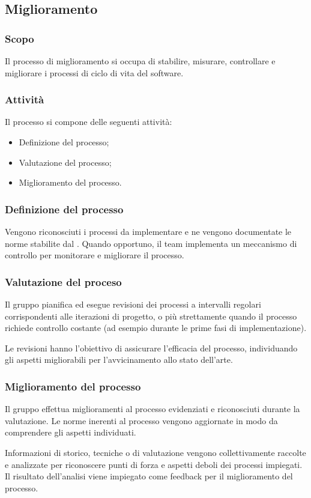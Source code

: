 \subsection{Miglioramento}
\subsubsection{Scopo}
\par Il processo di miglioramento si occupa di stabilire, misurare, controllare e migliorare i processi di ciclo di vita del software.

\subsubsection{Attività}
\par Il processo si compone delle seguenti attività:
\begin{itemize}
  \item Definizione del processo;
  \item Valutazione del processo;
  \item Miglioramento del processo.
\end{itemize}

\subsubsection{Definizione del processo}
\par Vengono riconosciuti i processi da implementare e ne vengono documentate le norme stabilite dal \WoW. Quando opportuno, il team implementa un meccanismo di controllo per monitorare e migliorare il processo.

\subsubsection{Valutazione del proceso}
\par Il gruppo pianifica ed esegue revisioni dei processi a intervalli regolari corrispondenti alle iterazioni di progetto, o più strettamente quando il processo richiede controllo costante (ad esempio durante le prime fasi di implementazione).

\par Le revisioni hanno l'obiettivo di assicurare l'efficacia del processo, individuando gli aspetti migliorabili per l'avvicinamento allo stato dell'arte.

\subsubsection{Miglioramento del processo}
\par Il gruppo effettua miglioramenti al processo evidenziati e riconosciuti durante la valutazione. Le norme inerenti al processo vengono aggiornate in modo da comprendere gli aspetti individuati.

\par Informazioni di storico, tecniche o di valutazione vengono collettivamente raccolte e analizzate per riconoscere punti di forza e aspetti deboli dei processi impiegati. Il risultato dell'analisi viene impiegato come feedback per il miglioramento del processo.
